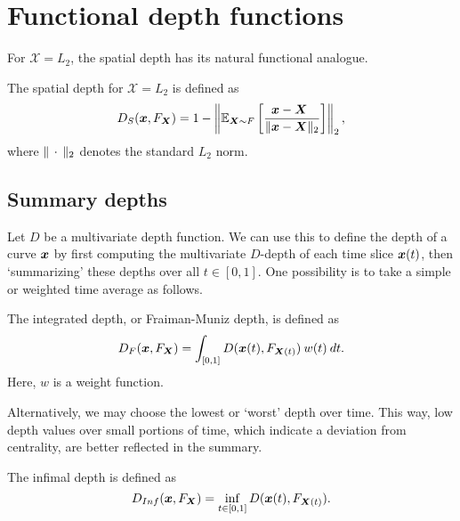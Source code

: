 \section{Functional depth functions}

For $\mathscr{X} = L_2$, the spatial depth has its natural functional
analogue.

\begin{definition}
    The spatial depth for $\mathscr{X} = L_2$ is defined as
    \begin{equation}
        D_S(\bm{x}, F_{\bm{X}}) = 1 - \left\Vert \operatorname{\mathbb{E}}_{\bm{X} \sim F} \left[\frac{\bm{x} - \bm{X}\;\,}{\Vert \bm{x} - \bm{X} \Vert_2}\right] \right\Vert_2,
    \end{equation}
    where $\Vert \,\cdot\, \Vert_2$ denotes the standard $L_2$ norm.
\end{definition}


\subsection{Summary depths}

Let $D$ be a multivariate depth function.
We can use this to define the depth of a curve $\bm{x}$ by first computing the
multivariate $D$-depth of each time slice $\bm{x}(t)$, then `summarizing' these
depths over all $t \in [0, 1]$.
One possibility is to take a simple or weighted time average as follows.

\begin{definition}
    The integrated depth, or Fraiman-Muniz depth, is defined as
    \begin{equation}
        D_F(\bm{x}, F_{\bm{X}}) = \int_{[0, 1]} D(\bm{x}(t), F_{\bm{X}(t)})\:w(t)\:dt.
    \end{equation}
    Here, $w$ is a weight function.
\end{definition}

Alternatively, we may choose the lowest or `worst' depth over time.
This way, low depth values over small portions of time, which indicate a
deviation from centrality, are better reflected in the summary.

\begin{definition}
    The infimal depth is defined as
    \begin{equation}
        D_{Inf}(\bm{x}, F_{\bm{X}}) = \inf_{t \in [0, 1]} D(\bm{x}(t), F_{\bm{X}(t)}).
    \end{equation}
\end{definition}



